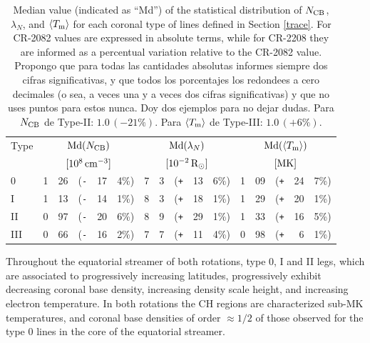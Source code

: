 \documentclass[namedreferences]{solarphysics}
\newcommand{\mrsun}{{\rm R_\odot}}
\newcommand{\med}{{\rm Md}}
\newcommand{\avgTe}{\left<\Tm\right>}
\newcommand{\MK}{{\rm MK}}
\newcommand{\lN}{\lambda_N}
\newcommand{\NCB}{N_{\rm CB}}
\newcommand{\Tm}{T_{\rm m}}
\newcommand{\aTm}{\left<\Tm\right>}
\newcommand{\Pl}{\texttt{+}}
\newcommand{\Mi}{\texttt{-}}
\def\diego#1{\textcolor{red}{#1}}
\begin{document}
\begin{article}
\begin{table}
\begin{tabular}{l r@{.}l@{\hskip 0.05in} r@{\hskip 0.01in} r@{.}l  r@{.}l@{\hskip 0.05in} r@{\hskip 0.01in} r@{.}l r@{.}l@{\hskip 0.05in} r@{\hskip 0.01in} r@{.}l }
\hline
Type    & \multicolumn{5}{c}{$\med(\NCB)$}             & \multicolumn{5}{c}{$\med(\lN)$} & \multicolumn{5}{c}{$\med(\avgTe)$} \\
       & \multicolumn{5}{c}{$[10^8\,{\rm cm}^{-3}]$}  & \multicolumn{5}{c}{$[{\rm 10}^{-2}\,\mrsun]$} & \multicolumn{5}{c}{$[\MK]$} \\
\hline
0    & 1&26 &(\Mi&17&4\%)  &   7&3 &(\Pl&13&6\%) &   1&09 &(\Pl&24&7\%) \\
I    & 1&13 &(\Mi&14&1\%)  &   8&3 &(\Pl&18&1\%) &   1&29 &(\Pl&20&1\%) \\
II   & 0&97 &(\Mi&20&6\%)  &   8&9 &(\Pl&29&1\%) &   1&33 &(\Pl&16&5\%) \\
III  & 0&66 &(\Mi&16&2\%)  &   7&7 &(\Pl&11&4\%) &   0&98 &(\Pl&~6&1\%) \\
\hline          
\end{tabular}
\caption{Median value (indicated as ``Md'') of the statistical distribution of $\NCB$, $\lN$, and $\aTm$ for each coronal type of lines defined in Section \ref{trace}. For CR-2082 values are expressed in absolute terms, while for CR-2208 they are informed as a percentual variation relative to the CR-2082 value. {Propongo que para todas las cantidades absolutas informes siempre dos cifras significativas, y que todos los porcentajes los redondees a cero decimales (o sea, a veces una y a veces dos cifras significativas) y que no uses puntos para estos nunca. Doy dos ejemplos para no dejar dudas. Para $\NCB$ de Type-II: $1.0\,(-21\%)$. Para $\aTm$ de Type-III: $1.0\,(+6\%)$.}}
\label{tabla_demt}
\end{table}

{Throughout} the equatorial streamer of both rotations, {type 0, I and II legs, which are associated to progressively} increasing latitudes, {progressively exhibit} decreasing {coronal base} density, {increasing density scale height, and increasing electron temperature}. In both rotations the CH regions are characterized sub-MK temperatures, and coronal base densities of order $\approx 1/2$ of {those observed for the type 0 lines in the core of} the equatorial streamer. 


\end{article}
\end{document}
